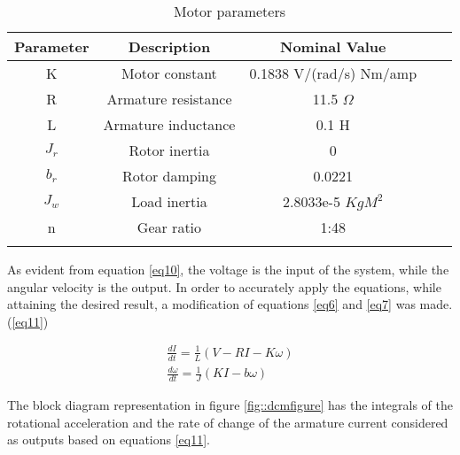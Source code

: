 \begin{table}[h]
\centering
\begin{tabular}{cccll}
\hline
Parameter                   & Description                               & Nominal Value                                 &  &  \\ \hline
\multicolumn{1}{|c|}{K}     & \multicolumn{1}{c|}{Motor constant}       & \multicolumn{1}{c|}{0.1838 V/(rad/s)  Nm/amp} &  &  \\ \cline{1-3}
\multicolumn{1}{|c|}{R}     & \multicolumn{1}{c|}{Armature resistance}  & \multicolumn{1}{c|}{11.5 $\Omega$}            &  &  \\ \cline{1-3}
\multicolumn{1}{|c|}{L}     & \multicolumn{1}{c|}{Armature inductance}  & \multicolumn{1}{c|}{0.1 H}                    &  &  \\ \cline{1-3}
\multicolumn{1}{|c|}{$J_r$} & \multicolumn{1}{c|}{Rotor inertia}       & \multicolumn{1}{c|}{0}                        &  &  \\ \cline{1-3}
\multicolumn{1}{|c|}{$b_r$} & \multicolumn{1}{c|}{Rotor damping}        & \multicolumn{1}{c|}{0.0221}                   &  &  \\ \cline{1-3}
\multicolumn{1}{|c|}{$J_w$} & \multicolumn{1}{c|}{Load inertia} & \multicolumn{1}{c|}{2.8033e-5 $KgM^2$}        &  &  \\ \cline{1-3}
\multicolumn{1}{|c|}{n}     & \multicolumn{1}{c|}{Gear ratio}           & \multicolumn{1}{c|}{1:48}                     &  &  \\ \cline{1-3}
\multicolumn{1}{l}{}        & \multicolumn{1}{l}{}                      & \multicolumn{1}{l}{}                          &  &  \\ \hline
\end{tabular}
\caption{Motor parameters}
\label{my-label}
\end{table}

As evident from equation \ref{eq10}, the voltage is the input of the system, while the angular velocity is the output. In order to accurately apply the equations, while attaining the desired result, a modification of equations \ref{eq6} and \ref{eq7} was made.(\ref{eq11})

\begin{align}
\frac{dI}{dt} = \frac{1}{L}(V - RI - K\omega)\label{eq11} \\
\frac{d\omega}{dt} = \frac{1}{J}(KI - b\omega) \nonumber
\end{align}

The block diagram representation in figure \ref{fig::dcmfigure} has the integrals of the rotational acceleration and the rate of change of the armature current considered as outputs based on equations \ref{eq11}.

